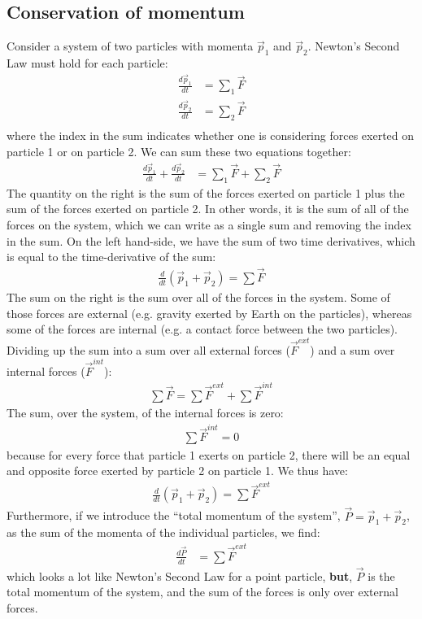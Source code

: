 \subsection{Conservation of momentum}
Consider a system of two particles with momenta $\vec p_1$ and $\vec p_2$.  Newton's Second Law must hold for each particle:
\begin{align*}
\frac{d\vec p_1}{dt}&=\sum_1 \vec F\\
\frac{d\vec p_2}{dt}&=\sum_2 \vec F\\
\end{align*}
where the index in the sum indicates whether one is considering forces exerted on particle 1 or on particle 2. We can sum these two equations together:
\begin{align*}
\frac{d\vec p_1}{dt}+\frac{d\vec p_2}{dt} &= \sum_1 \vec F+\sum_2 \vec F
\end{align*}
The quantity on the right is the sum of the forces exerted on particle 1 plus the sum of the forces exerted on particle 2. In other words, it is the sum of all of the forces on the system, which we can write as a single sum and removing the index in the sum. On the left hand-side, we have the sum of two time derivatives, which is equal to the time-derivative of the sum:
\begin{align*}
\frac{d}{dt}(\vec p_1 + \vec p_2) = \sum \vec F
\end{align*}
The sum on the right is the sum over all of the forces in the system. Some of those forces are external (e.g. gravity exerted by Earth on the particles), whereas some of the forces are internal (e.g. a contact force between the two particles). Dividing up the sum into a sum over all external forces ($\vec F^{ext}$) and a sum over internal forces ($\vec F^{int}$):
\begin{align*}
\sum \vec F = \sum \vec F^{ext} + \sum \vec F^{int} 
\end{align*}
The sum, over the system, of the internal forces is zero:
\begin{align*}
\sum \vec F^{int} = 0
\end{align*}
because for every force that particle 1 exerts on particle 2, there will be an equal and opposite force exerted by particle 2 on particle 1. We thus have:
\begin{align*}
\frac{d}{dt}(\vec p_1 + \vec p_2) = \sum \vec F^{ext}
\end{align*}
Furthermore, if we introduce the ``total momentum of the system'', $\vec P=\vec p_1 + \vec p_2$, as the sum of the momenta of the individual particles, we find:
\begin{align*}
\frac{d\vec P}{dt} &= \sum \vec F^{ext}
\end{align*}
which looks a lot like Newton's Second Law for a point particle, \textbf{but}, $\vec P$ is the total momentum of the system, and the sum of the forces is only over external forces.

